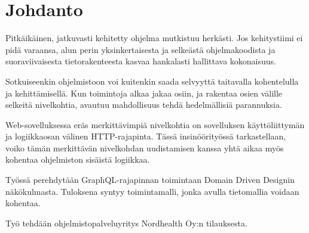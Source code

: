 \hypertarget{johdanto}{%
\chapter{Johdanto}\label{johdanto}}

Pitkäikäinen, jatkuvasti kehitetty ohjelma mutkistuu herkästi. Jos
kehitystiimi ei pidä varaansa, alun perin yksinkertaisesta ja selkeästä
ohjelmakoodista ja suoraviivaisesta tietorakenteesta kasvaa hankalasti
hallittava kokonaisuus.

Sotkuiseenkin ohjelmistoon voi kuitenkin saada selvyyttä taitavalla
kohentelulla ja kehittämisellä. Kun toimintoja alkaa jakaa osiin, ja
rakentaa osien välille selkeitä nivelkohtia, avautuu mahdollisuus tehdä
hedelmällisiä parannuksia.

Web-sovelluksessa eräs merkittävimpiä nivelkohtia on sovelluksen
käyttöliittymän ja logiikkaosan välinen HTTP-rajapinta. Tässä
insinöörityössä tarkastellaan, voiko tämän merkittävän nivelkohdan
uudistamisen kanssa yhtä aikaa myös kohentaa ohjelmiston sisäistä
logiikkaa.

Työssä perehdytään GraphQL-rajapinnan toimintaan Domain Driven Designin
näkökulmasta. Tuloksena syntyy toimintamalli, jonka avulla tietomallia
voidaan kohentaa.

Työ tehdään ohjelmistopalveluyritys Nordhealth Oy:n tilauksesta.

